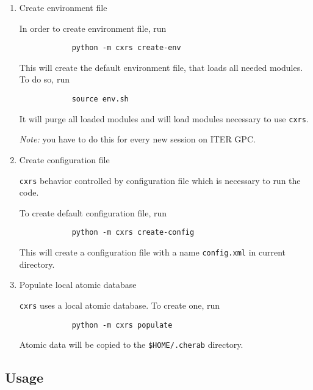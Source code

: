 \documentclass[../main.tex]{subfiles}
\begin{document}
\begin{enumerate}[label = Step \arabic*:, align = left]

    \item Create environment file

          In order to create environment file, run

          \begin{verbatim}
            python -m cxrs create-env
          \end{verbatim}

          This will create the default environment file, that loads all needed modules. To do so, run

          \begin{verbatim}
            source env.sh
          \end{verbatim}

          It will purge all loaded modules and will load modules necessary to use \texttt{cxrs}.

          \emph{Note:} you have to do this for every new session on ITER GPC.


    \item {Create configuration file}

          \texttt{cxrs} behavior controlled by configuration file which is necessary to run the code.

          To create default configuration file, run

          \begin{verbatim}
            python -m cxrs create-config
          \end{verbatim}

          This will create a configuration file with a name \texttt{config.xml} in current directory.


    \item {Populate local atomic database}

          \texttt{cxrs} uses a local atomic database. To create one, run

          \begin{verbatim}
            python -m cxrs populate
          \end{verbatim}

          Atomic data will be copied to the \texttt{\$HOME/.cherab} directory.

\end{enumerate}

\subsection{Usage}
\end{document}
